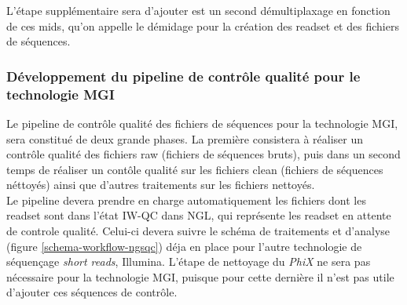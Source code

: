 L'étape supplémentaire sera d'ajouter est un second démultiplaxage en fonction de ces mids, qu'on appelle le démidage pour la création des readset et des fichiers de séquences.

\subsubsection{Développement du pipeline de contrôle qualité pour le technologie MGI}
Le pipeline de contrôle qualité des fichiers de séquences pour la technologie MGI, sera constitué de deux grande phases. La première consistera à réaliser un contrôle qualité des fichiers \og raw\fg{} (fichiers de séquences bruts), puis dans un second temps de réaliser un contôle qualité sur les fichiers \og clean\fg{} (fichiers de séquences néttoyés) ainsi que d'autres traitements sur les fichiers nettoyés.\\

Le pipeline devera prendre en charge automatiquement les fichiers dont les readset sont dans l'état \og IW-QC\fg{} dans NGL, qui représente les readset en attente de controle qualité. Celui-ci devera suivre le schéma de traitements et d'analyse (figure \ref{schema-workflow-ngsqc}) déja en place pour l'autre technologie de séquençage \emph{short reads}, Illumina. L'étape de nettoyage du \emph{PhiX} ne sera pas nécessaire pour la technologie MGI, puisque pour cette dernière il n'est pas utile d'ajouter ces séquences de contrôle.\\

